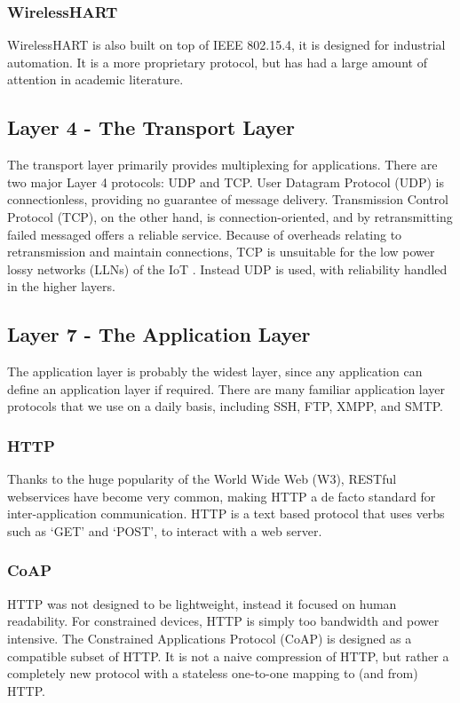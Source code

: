 \documentclass[10pt,journal,compsoc]{IEEEtran}
\begin{document}
\subsubsection{WirelessHART}
WirelessHART is also built on top of IEEE 802.15.4, it is designed for
industrial automation. It is a more proprietary protocol, but has had a large
amount of attention in academic literature.  

\subsection{Layer 4 - The Transport Layer}
The transport layer primarily provides multiplexing for applications. There are
two major Layer 4 protocols:  UDP and TCP. User Datagram Protocol (UDP) is
connectionless, providing no guarantee of message delivery.  Transmission
Control Protocol (TCP), on the other hand, is connection-oriented, and by
retransmitting failed messaged offers a reliable service. Because of overheads
relating to retransmission and maintain connections, TCP is unsuitable for the
low power lossy networks (LLNs) of the IoT \cite{embedded}. Instead UDP is
used, with reliability handled in the higher layers.

\subsection{Layer 7 - The Application Layer}
The application layer is probably the widest layer, since any application can
define an application layer if required. There are many familiar
application layer protocols that we use on a daily basis, including SSH,
FTP, XMPP, and SMTP. 

\subsubsection{HTTP} 
Thanks to the huge popularity of the World Wide Web (W3), RESTful webservices
have become very common, making HTTP a de facto standard for inter-application
communication. HTTP is a text based protocol that uses verbs such as `GET' and
`POST', to interact with a web server.  

\subsubsection{CoAP}
HTTP was not designed to be lightweight, instead it focused on human
readability. For constrained devices, HTTP is simply too bandwidth and power
intensive. The Constrained Applications Protocol (CoAP) is designed as a
compatible subset of HTTP. It is not a naive compression of HTTP, but rather a
completely new protocol with a stateless one-to-one mapping to (and from) HTTP. 
\end{document}
